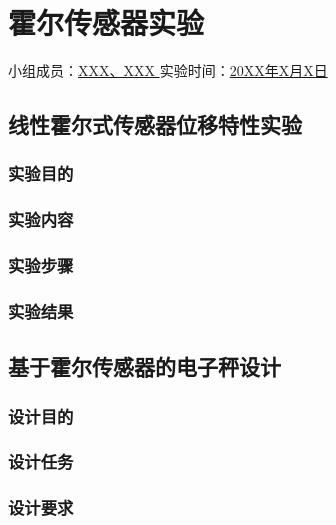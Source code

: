 \section{霍尔传感器实验}

\begin{center}
    {
        小组成员：\underline{\quad XXX、XXX \quad} \quad
        实验时间：\underline{\quad 20XX年X月X日 \quad}
    }
\end{center}

\subsection{线性霍尔式传感器位移特性实验}

\subsubsection{实验目的}

\subsubsection{实验内容}

\subsubsection{实验步骤}

\subsubsection{实验结果}

\subsection{基于霍尔传感器的电子秤设计}

\subsubsection{设计目的}

\subsubsection{设计任务}

\subsubsection{设计要求}


